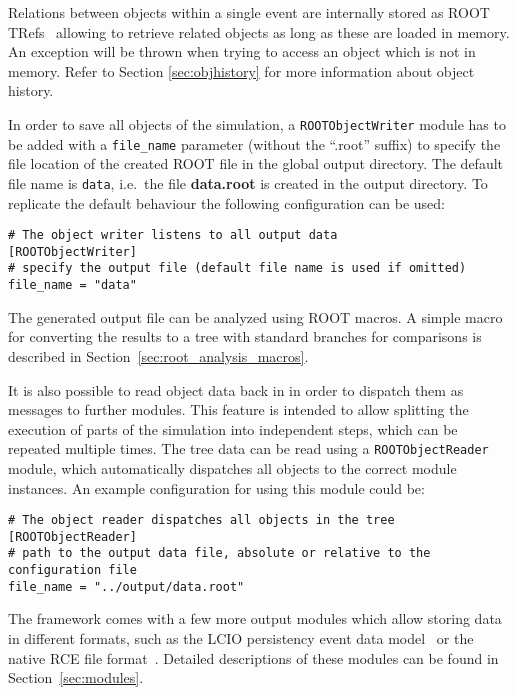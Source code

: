 Relations between objects within a single event are internally stored as ROOT TRefs~\cite{roottref} allowing to retrieve related objects as long as these are loaded in memory.
An exception will be thrown when trying to access an object which is not in memory.
Refer to Section \ref{sec:objhistory} for more information about object history.

In order to save all objects of the simulation, a \texttt{ROOTObjectWriter} module has to be added with a \texttt{file\_name} parameter (without the ``.root'' suffix) to specify the file location of the created ROOT file in the global output directory.
The default file name is \texttt{data}, i.e.\ the file \textbf{data.root} is created in the output directory.
To replicate the default behaviour the following configuration can be used:
\begin{verbatim}
# The object writer listens to all output data
[ROOTObjectWriter]
# specify the output file (default file name is used if omitted)
file_name = "data"
\end{verbatim}
The generated output file can be analyzed using ROOT macros.
A simple macro for converting the results to a tree with standard branches for comparisons is described in Section~\ref{sec:root_analysis_macros}.

It is also possible to read object data back in in order to dispatch them as messages to further modules.
This feature is intended to allow splitting the execution of parts of the simulation into independent steps, which can be repeated multiple times.
The tree data can be read using a \texttt{ROOTObjectReader} module, which automatically dispatches all objects to the correct module instances.
An example configuration for using this module could be:
\begin{verbatim}
# The object reader dispatches all objects in the tree
[ROOTObjectReader]
# path to the output data file, absolute or relative to the configuration file
file_name = "../output/data.root"
\end{verbatim}

The \apsq framework comes with a few more output modules which allow storing data in different formats, such as the LCIO persistency event data model~\cite{lcio} or the native RCE file format~\cite{rce}.
Detailed descriptions of these modules can be found in Section~\ref{sec:modules}.
